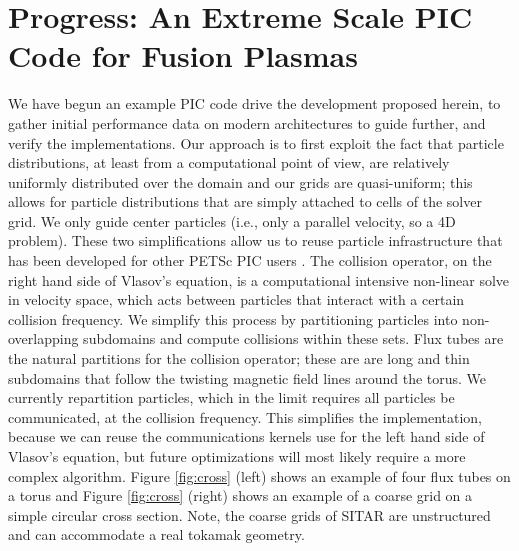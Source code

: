 \documentclass[review]{siamart}
\begin{document}
\section{Progress: An Extreme Scale PIC Code for Fusion Plasmas}

We have begun an example PIC code drive the development proposed herein, to gather initial performance data on modern architectures to guide further, and verify the implementations.
Our approach is to first exploit the fact that particle distributions, at least from a computational point of view, are relatively uniformly distributed over the domain and our grids are quasi-uniform; this allows for particle distributions that are simply attached to cells of the solver grid.
We only guide center particles (i.e., only a parallel velocity, so a 4D problem).
These two simplifications allow us to reuse particle infrastructure that has been developed for other PETSc PIC users \cite{may2014ptatin}.
The collision operator, on the right hand side of Vlasov's equation, is a computational intensive non-linear solve in velocity space, which acts between particles that interact with a certain collision frequency.
We simplify this process by partitioning particles into non-overlapping subdomains and compute collisions within these sets.
Flux tubes are the natural partitions for the collision operator; these are are long and thin subdomains that follow the twisting magnetic field lines around the torus.
We currently repartition particles, which in the limit requires all particles be communicated, at the collision frequency.
This simplifies the implementation, because we can reuse the communications kernels use for the left hand side of Vlasov's equation, but future optimizations will most likely require a more complex algorithm.
Figure \ref{fig:cross} (left) shows an example of four flux tubes on a torus and Figure \ref{fig:cross} (right) shows an example of a coarse grid on a simple circular cross section.
Note, the coarse grids of SITAR are unstructured and can accommodate a real tokamak geometry.
\end{document}
